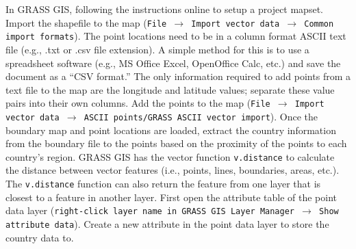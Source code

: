 In GRASS GIS, following the instructions online to setup a project mapset\footnotemark.  
Import the shapefile to the map (\texttt{File $\rightarrow$ Import vector data $\rightarrow$ Common import formats}).  
The point locations need to be in a column format ASCII text file (e.g., .txt or .csv file extension).  
A simple method for this is to use a spreadsheet software (e.g., MS Office Excel, OpenOffice Calc, etc.) and save the document as a ``CSV format.'' 
The only information required to add points from a text file to the map are the longitude and latitude values; separate these value pairs into their own columns.  
Add the points to the map (\texttt{File $\rightarrow$ Import vector data $\rightarrow$ ASCII points/GRASS ASCII vector import}).  
Once the boundary map and point locations are loaded, extract the country information from the boundary file to the points based on the proximity of the points to each country's region.  
GRASS GIS has the vector function \texttt{v.distance} to calculate the distance between vector features (i.e., points, lines, boundaries, areas, etc.).  
The \texttt{v.distance} function can also return the feature from one layer that is closest to a feature in another layer.  
First open the attribute table of the point data layer (\texttt{right-click layer name in GRASS GIS Layer Manager $\rightarrow$ Show attribute data}).  
Create a new attribute in the point data layer to store the country data to.

